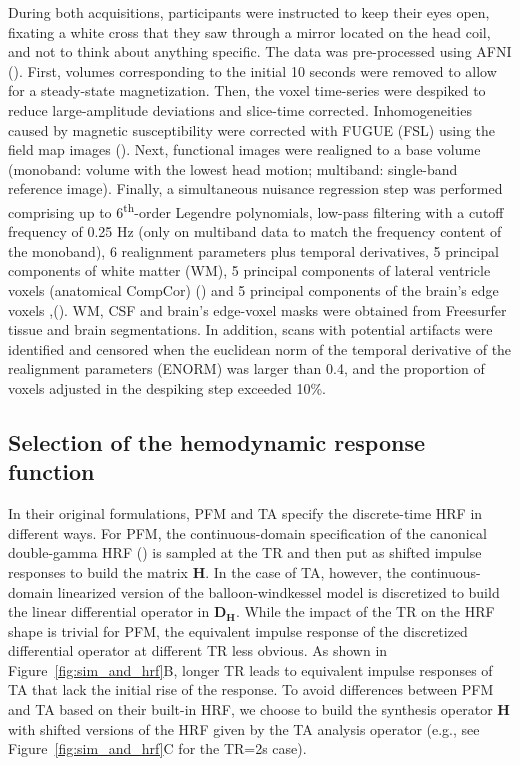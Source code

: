 During both acquisitions, participants were instructed to keep their eyes open, fixating a white cross that they saw through a mirror located on the head coil, and not to think about anything specific. The data was pre-processed using AFNI (\citealt{Cox1996AFNISoftwareAnalysis}). First, volumes corresponding to the initial 10 seconds were removed to allow for a steady-state magnetization. Then, the voxel time-series were despiked to reduce large-amplitude deviations and slice-time corrected. Inhomogeneities caused by magnetic susceptibility were corrected with FUGUE (FSL) using the field map images (\citealt{Jenkinson2012FSL}). Next, functional images were realigned to a base volume (monoband: volume with the lowest head motion; multiband: single-band reference image). Finally, a simultaneous nuisance regression step was performed comprising up to 6\textsuperscript{th}-order Legendre polynomials, low-pass filtering with a cutoff frequency of 0.25 Hz (only on multiband data to match the frequency content of the monoband), 6 realignment parameters plus temporal derivatives, 5 principal components of white matter (WM), 5 principal components of lateral ventricle voxels (anatomical CompCor) (\citealt{Behzadi_2007}) and 5 principal components of the brain's edge voxels ,(\citealt{Patriat_2015}). WM, CSF and brain's edge-voxel masks were obtained from Freesurfer tissue and brain segmentations. In addition, scans with potential artifacts were identified and censored when the euclidean norm of the temporal derivative of the realignment parameters (ENORM) was larger than 0.4, and the proportion of voxels adjusted in the despiking step exceeded 10\%.

\subsection{Selection of the hemodynamic response function}

In their original formulations, PFM and TA specify the discrete-time HRF in different ways. For PFM, the continuous-domain specification of the canonical double-gamma HRF (\citealt{HENSON2007178}) is sampled at the TR and then put as shifted impulse responses to build the matrix $\mathbf{H}$.  In the case of TA, however, the continuous-domain linearized version of the balloon-windkessel model is discretized to build the linear differential operator in $\mathbf{D_H}$. While the impact of the TR on the HRF shape is trivial for PFM, the equivalent impulse response of the discretized differential operator at different TR less obvious. As shown in Figure~\ref{fig:sim_and_hrf}B, longer TR leads to equivalent impulse responses of TA that lack the initial rise of the response. To avoid differences between PFM and TA based on their built-in HRF, we choose to build the synthesis operator $\mathbf{H}$ with shifted versions of the HRF given by the TA analysis operator (e.g., see Figure~\ref{fig:sim_and_hrf}C for the TR=2s case).

